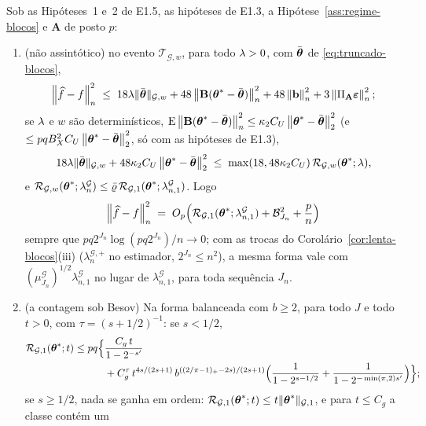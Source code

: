 \documentclass[11pt,a4paper]{article}
\newcommand{\Amat}{\mathbf{A}}
\newcommand{\Bmat}{\mathbf{B}}
\newcommand{\PA}{\Pi_{\Amat}}
\newcommand{\bveps}{\boldsymbol{\varepsilon}}
\newcommand{\bb}{\mathbf{b}}
\newcommand{\thbar}{\bar{\btheta}}
\newcommand{\Gcal}{\mathcal{G}}
\newcommand{\nGw}[1]{\lVert #1\rVert_{\mathcal{G},w}}
\newcommand{\nGone}[1]{\lVert #1\rVert_{\mathcal{G},1}}
\newcommand{\lamG}{\lambda^{\mathcal{G}}_{n}}
\newcommand{\lamGone}{\lambda^{\mathcal{G}}_{n,1}}
\newcommand{\lamGp}{\lambda^{\mathcal{G},+}_{n}}   %
\newcommand{\Tw}{\mathcal{T}_{\mathcal{G},w}}
\begin{document}
\begin{corollary}
\label{cor:truncada-blocos}
Sob as Hipóteses~1 e~2 de E1.5, as hipóteses de E1.3, a
Hipótese~\ref{ass:regime-blocos} e $\Amat$ de posto $p$:
\begin{enumerate}[label=\textup{(\roman*)}, leftmargin=*]
  \item \textup{(não assintótico)} no evento $\Tw$, para todo $\lambda > 0$, com
    $\thbar$ de \eqref{eq:truncado-blocos},
    \[
      \normn{\widehat f - f}^{2}
      \;\le\; 18\pen\nGw{\thbar} + 48\normn{\Bmat(\thetastar - \thbar)}^{2}
      + 48\normn{\bb}^{2} + 3\normn{\PA\bveps}^{2};
    \]
    se $\lambda$ e $w$ são determinísticos,
    $\E\normn{\Bmat(\thetastar - \thbar)}^{2} \le \kappa_{2}C_{U}
    \norm{\thetastar - \thbar}_{2}^{2}$ (e $\le pqB_{X}^{2}C_{U}
    \norm{\thetastar - \thbar}_{2}^{2}$, só com as hipóteses de E1.3),
    \[
      18\pen\nGw{\thbar} + 48\kappa_{2}C_{U}\norm{\thetastar - \thbar}_{2}^{2}
      \;\le\; \max(18,48\kappa_{2}C_{U})\,\mathcal{R}_{\Gcal,w}(\thetastar;\pen),
    \]
    e $\mathcal{R}_{\Gcal,w}(\thetastar;\lamG) \le
    \bar\varrho\,\mathcal{R}_{\Gcal,1}(\thetastar;\lamGone)$. Logo
    \[
      \normn{\widehat f - f}^{2} \;=\; O_{p}\Bigl(\mathcal{R}_{\Gcal,1}(\thetastar;\lamGone)
      + \mathcal{B}_{J_{n}}^{2} + \frac{p}{n}\Bigr)
    \]
    sempre que $pq2^{J_{n}}\log(pq2^{J_{n}})/n \to 0$; com as trocas do
    Corolário~\ref{cor:lenta-blocos}(iii) ($\lamGp$ no estimador, $2^{J_{n}} \le
    n^{2}$), a mesma forma vale com $(\mu^{\Gcal}_{J_{n}})^{1/2}\lamGone$ no lugar
    de $\lamGone$, para toda sequência $J_{n}$.
  \item \textup{(a contagem sob Besov)} Na forma balanceada com $b \ge 2$, para
    todo $J$ e todo $t > 0$, com $\tau = (s+1/2)^{-1}$: se $s < 1/2$,
    \begin{equation}
      \label{eq:contagem-truncada-blocos}
      \begin{aligned}
      \mathcal{R}_{\Gcal,1}(\thetastar;t) \le pq\Bigl\{&\frac{C_{g}\,t}{1 - 2^{-\seff}}\\
      &+ C_{g}^{\tau}\,t^{4s/(2s+1)}\,b^{((2/\pi-1)_{+}-2s)/(2s+1)}
      \Bigl(\frac{1}{1 - 2^{s-1/2}} + \frac{1}{1 - 2^{-\min(\pi,2)\seff}}\Bigr)\Bigr\};
      \end{aligned}
    \end{equation}
    se $s \ge 1/2$, nada se ganha em ordem: $\mathcal{R}_{\Gcal,1}(\thetastar;t)
    \le t\nGone{\thetastar}$, e para $t \le C_{g}$ a classe contém um

\end{enumerate}
\end{corollary}
\end{document}
